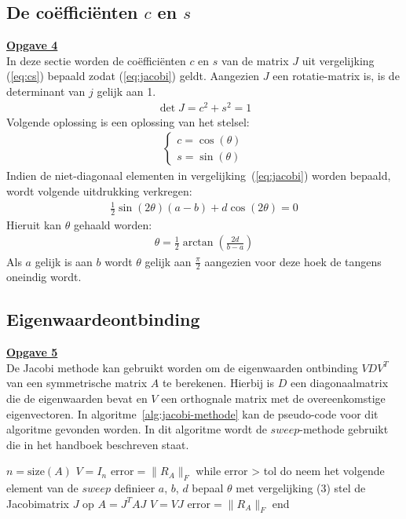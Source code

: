 \documentclass[a4paper, 12pt, titlepage, fleqn]{article}
\begin{document}
\subsection{De co\"effici\"enten $c$ en $s$}
\underline{\textbf{Opgave 4}}\\

In deze sectie worden de co\"effici\"enten $c$ en $s$ van de matrix $J$ uit vergelijking (\ref{eq:cs}) bepaald zodat (\ref{eq:jacobi}) geldt. Aangezien $J$ een rotatie-matrix is, is de determinant van $j$ gelijk aan 1.
\begin{align*}
\det J = c^2 + s^2 = 1
\end{align*}
Volgende oplossing is een oplossing van het stelsel:
\begin{align*}
\begin{cases}
c = \cos(\theta)\\
s = \sin(\theta)
\end{cases}
\end{align*}
Indien de niet-diagonaal elementen in vergelijking~(\ref{eq:jacobi}) worden bepaald, wordt volgende uitdrukking verkregen:
\begin{align*}
\frac{1}{2}\sin(2\theta)(a-b) + d\cos(2\theta) = 0
\end{align*}
Hieruit kan $\theta$ gehaald worden:
\begin{align}\label{eq:theta}
\theta = \frac{1}{2}\arctan\left(\frac{2d}{b-a}\right)
\end{align}
Als $a$ gelijk is aan $b$ wordt $\theta$ gelijk aan $\frac{\pi}{2}$ aangezien voor deze hoek de tangens oneindig wordt.

\subsection{Eigenwaardeontbinding}
\underline{\textbf{Opgave 5}}\\

De Jacobi methode kan gebruikt worden om de eigenwaarden ontbinding $VDV^T$ van een symmetrische matrix $A$ te berekenen. Hierbij is $D$ een diagonaalmatrix die de eigenwaarden bevat en $V$ een orthognale matrix met de overeenkomstige eigenvectoren. In algoritme~\ref{alg:jacobi-methode} kan de pseudo-code voor dit algoritme gevonden worden. In dit algoritme wordt de $sweep$-methode gebruikt die in het handboek beschreven staat.

\begin{algorithm}[caption={Jacobi-methode}, label={alg:jacobi-methode}]
$n = \text{size}(A)$
$V = I_n$
$\text{error} = \|R_A\|_F$
while error > tol do
	neem het volgende element van de $sweep$
	definieer $a$, $b$, $d$
	bepaal $\theta$ met vergelijking (3)
	stel de Jacobimatrix $J$ op
	$A = J^TAJ$
	$V = VJ$
	$\text{error} = \|R_A\|_F$
end
\end{algorithm}
\end{document}

